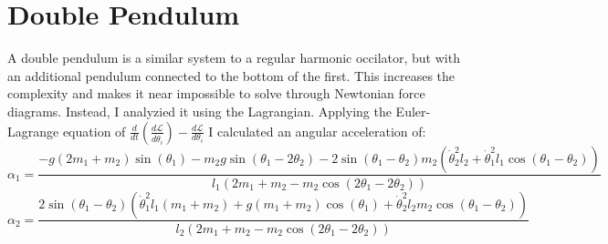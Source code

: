 \documentclass{article}
\begin{document}
    \section*{Double Pendulum}
    A double pendulum is a similar system to a regular harmonic occilator, but with an additional
    pendulum connected to the bottom of the first. This increases the complexity and makes it near
    impossible to solve through Newtonian force diagrams. Instead, I analyzied it using the Lagrangian.
    Applying the Euler-Lagrange equation of 
    $\frac{d}{dt}\left(\frac{d\mathcal{L}}{d\dot{\theta}_i}\right)-\frac{d\mathcal{L}}{d\theta_i}$
    I calculated an angular acceleration of:
    $$
    \alpha_1 =\frac{-g(2m_1 + m_2) \sin(\theta_1) - m_2 g \sin(\theta_1 - 2\theta_2) - 2 \sin(\theta_1 - \theta_2) m_2 (\dot{\theta}_2^2 l_2 + \dot{\theta}_1^2 l_1 \cos(\theta_1 - \theta_2))}{l_1 (2m_1 + m_2 - m_2 \cos(2\theta_1 - 2\theta_2))}
    $$$$
    \alpha_2 = \frac{2 \sin(\theta_1 - \theta_2) (\dot{\theta}_1^2 l_1 (m_1 + m_2) + g (m_1 + m_2) \cos(\theta_1) + \dot{\theta}_2^2 l_2 m_2 \cos(\theta_1 - \theta_2))}{l_2 (2m_1 + m_2 - m_2 \cos(2\theta_1 - 2\theta_2))}
    $$
\end{document}
